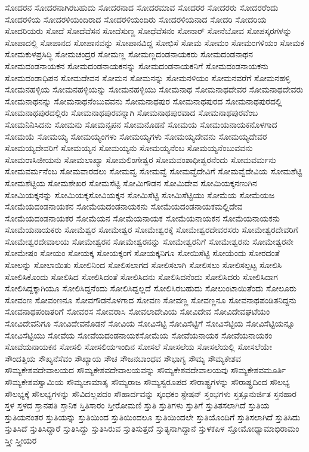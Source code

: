 {ಸೋದರನ
ಸೋದರನಾಗಿರಬಹುದು
ಸೋದರನಾದ
ಸೋದರಮಾವ
ಸೋದರರ
ಸೋದರರು
ಸೋದರರೆಂದು
ಸೋದರಳಿಯ
ಸೋದರಳಿಯಂದಿರಾದ
ಸೋದರಳಿಯಂದಿರು
ಸೋದರಳಿಯನಾದ
ಸೋದರಿ
ಸೋದರಿಯ
ಸೋದರಿಯರು
ಸೋದೆ
ಸೋದೆವೆಸನ
ಸೋದೆಸುಣ್ಣ
ಸೋಧೆವೆಸನಂ
ಸೋನಾರ್
ಸೋನೆಬೋವ
ಸೋಪಸ್ಕರಗಳನ್ನು
ಸೋಪಾದಲ್ಲಿ
ಸೋಪಾನದ
ಸೋಪಾನವನ್ನು
ಸೋಪಾನವಿದ್ದ
ಸೋಭಿಸೆ
ಸೋಮ
ಸೋಮಂ
ಸೋಮಂಗಳಿಯಂ
ಸೋಮಕ
ಸೋಮಕುಳಪ್ರಸಿದ್ಧಿ
ಸೋಮಚಂದ್ರರ
ಸೋಮಣ್ಣ
ಸೋಮಣ್ಣದಂಡನಾಯಕರು
ಸೋಮದಂಡನಾಥನ
ಸೋಮದಂಡನಾಯಕನ
ಸೋಮದಂಡನಾಯಕನನ್ನು
ಸೋಮದಂಡನಾಯಕನಿಗೆ
ಸೋಮದಂಡನಾಯಕನು
ಸೋಮದಂಡಾಧಿಪನ
ಸೋಮದೇವನ
ಸೋಮನ
ಸೋಮನನ್ನು
ಸೋಮನಳಿಯಂ
ಸೋಮನವರೆಗೆ
ಸೋಮನಹಳ್ಳಿ
ಸೋಮನಹಳ್ಳಿಯ
ಸೋಮನಹಳ್ಳಿಯನ್ನು
ಸೋಮನಹಳ್ಳಿಯು
ಸೋಮನಾಥ
ಸೋಮನಾಥದೇವರ
ಸೋಮನಾಥದೇವರು
ಸೋಮನಾಥನನ್ನು
ಸೋಮನಾಥನೆಂಬುವವನು
ಸೋಮನಾಥಪುರ
ಸೋಮನಾಥಪುರದ
ಸೋಮನಾಥಪುರದಲ್ಲಿ
ಸೋಮನಾಥಪುರದಲ್ಲಿರು
ಸೋಮನಾಥಪುರವನ್ನಾಗಿ
ಸೋಮನಾಥಪುರವಾದ
ಸೋಮನಾಥಪುರವೆಂಬ
ಸೋಮನಿನಿಸಿದನು
ಸೋಮನು
ಸೋಮನೃಪನ
ಸೋಮನೊಡನೆ
ಸೋಮಯ
ಸೋಮಯನಾಯಕನೊಳಗಾದ
ಸೋಮಯೆ
ಸೋಮಯ್ಯ
ಸೋಮಯ್ಯಂಗಳು
ಸೋಮಯ್ಯಗಳು
ಸೋಮಯ್ಯದೇವನು
ಸೋಮಯ್ಯದೇವರ
ಸೋಮಯ್ಯದೇವರಿಗೆ
ಸೋಮಯ್ಯನ
ಸೋಮಯ್ಯನು
ಸೋಮಯ್ಯನೆಂಬ
ಸೋಮಯ್ಯನೆಂಬುವವನು
ಸೋಮರಾಸಿಜೀಯನು
ಸೋಮಲಾಖ್ಯಾ
ಸೋಮಲಿಂಗೇಶ್ವರ
ಸೋಮವಂಶಾಧೀಶ್ವರನೆಂದು
ಸೋಮವರ್ಮನು
ಸೋಮವರ್ಮನೆಂಬ
ಸೋಮವಾರದಲು
ಸೋಮವ್ವ
ಸೋಮವ್ವೆ
ಸೋಮವ್ವೆದೇವಿಗೆ
ಸೋಮವ್ವೆದೇವಿಯ
ಸೋಮಶೆಟ್ಟಿ
ಸೋಮಶೆಟ್ಟಿಯ
ಸೋಮಶೇಖರ
ಸೋಮಸೆಟ್ಟಿ
ಸೋಮಿಗೌಡನ
ಸೋಮಿದೇವ
ಸೋಮಿಯಕ್ಕನಣುಗಿನ
ಸೋಮಿಯಕ್ಕನನ್ನು
ಸೋಮಿಯಕ್ಕಸೋವಿಯಕ್ಕನ
ಸೋಮಿಸೆಟ್ಟಿ
ಸೋಮಿಸೆಟ್ಟಿಯು
ಸೋಮೆಯ
ಸೋಮೆಯಜ
ಸೋಮೆಯದಂಡನಾಯಕನ
ಸೋಮೆಯದಂಡನಾಯಕನು
ಸೋಮೆಯದಂಡನಾಯಕಮಲ್ಲಿದೇವ
ಸೋಮೆಯದಂಡನಾಯಕರ
ಸೋಮೆಯನ
ಸೋಮೆಯನಾಯಕ
ಸೋಮೆಯನಾಯಕನ
ಸೋಮೆಯನಾಯಕನು
ಸೋಮೆಯನಾಯಕರು
ಸೋಮೆಶ್ವರ
ಸೋಮೇಶ್ವರ
ಸೋಮೇಶ್ವರಕ್ಕೆ
ಸೋಮೇಶ್ವರದೇವರಸರು
ಸೋಮೇಶ್ವರದೇವರಿಗೆ
ಸೋಮೇಶ್ವರದೇವಾಲಯ
ಸೋಮೇಶ್ವರನ
ಸೋಮೇಶ್ವರನನ್ನು
ಸೋಮೇಶ್ವರನಿಗೆ
ಸೋಮೇಶ್ವರನು
ಸೋಮೇಶ್ವರನೇ
ಸೋಮೇಷಂ
ಸೋಯಂ
ಸೋಯಕ್ಕ
ಸೋಯಕ್ಕಂಗೆ
ಸೋಯಕ್ಕನಿಗೂ
ಸೋಯಿಸೆಟ್ಟಿ
ಸೋಯೆಂದು
ಸೋರದಂತೆ
ಸೋಲನ್ನು
ಸೋಲಾಯಿತು
ಸೋಲಿನಿಂದ
ಸೋಲಿಸಲಾಗದ
ಸೋಲಿಸಲಾಗಿ
ಸೋಲಿಸಲು
ಸೋಲಿಸಲ್ಪಟ್ಟ
ಸೋಲಿಸಿ
ಸೋಲಿಸಿಕೊಂದು
ಸೋಲಿಸಿದ
ಸೋಲಿಸಿದಂತೆ
ಸೋಲಿಸಿದನು
ಸೋಲಿಸಿದನೆಂದು
ಸೋಲಿಸಿದರು
ಸೋಲಿಸಿದಾಗ
ಸೋಲಿಸಿದ್ದಕ್ಕಾಗಿಯೂ
ಸೋಲಿಸಿದ್ದನೆಂದು
ಸೋಲಿಸಿದ್ದಲ್ಲದೆ
ಸೋಲಿಸಿರಬಹುದು
ಸೋಲುಂಟಾಯಿತೆಂದು
ಸೋಲೂರು
ಸೋವಂಣ
ಸೋವಂಣನೂ
ಸೋವಗೌಡನೊಳಗಾದ
ಸೋವಣ
ಸೋವಣ್ಣ
ಸೋವಣ್ಣನೂ
ಸೋವನಾಥಪಂಡಿತನಿದ್ದನು
ಸೋವನಾಥಪಂಡಿತರಿಗೆ
ಸೋವರಸ
ಸೋವರಾಸಿ
ಸೋವಲಾದೇವಿಯ
ಸೋವಿದೇವ
ಸೋವಿದೇವಘಟೆಯಂ
ಸೋವಿದೇವನಿಗೂ
ಸೋವಿದೇವನೊಡನೆ
ಸೋವಿಯ
ಸೋವಿಸೆಟ್ಟಿ
ಸೋವಿಸೆಟ್ಟಿಗೆ
ಸೋವಿಸೆಟ್ಟಿಯ
ಸೋವಿಸೆಟ್ಟಿಯನ್ನೂ
ಸೋವಿಸೆಟ್ಟಿಯು
ಸೋವೆಯ
ಸೋವೆಯದಂಡನಾಯಕಸೋಮೆಯ
ಸೋವೆಯನಾಯಕ
ಸೋವೆಯನಾಯಕಂ
ಸೋವೆಯನಾಯಕನ
ಸೋಸಲಿ
ಸೋಸಲಿಯಇಂದಿನ
ಸೋಸಲೆ
ಸೋಸಲೆಯ
ಸೋಸಲೆಯಲ್ಲಿ
ಸೋಸಲೆಯೇ
ಸೌಂದತ್ತಿಯ
ಸೌಖ್ಯನೆಸೆವಂ
ಸೌಖ್ಯಾಯ
ಸೌಚ
ಸೌಜನಬಾಂಧವ
ಸೌಭಾಗ್ಯ
ಸೌಮ್ಯ
ಸೌಮ್ಯಕೇಶವ
ಸೌಮ್ಯಕೇಶವದೇವಾಲಯದ
ಸೌಮ್ಯಕೇಶವದೇವಾಲಯವನ್ನು
ಸೌಮ್ಯಕೇಶವದೇವಾಲಯವು
ಸೌಮ್ಯಕೇಶವಮೂರ್ತಿ
ಸೌಮ್ಯಕೇಶವಸ್ವಾಮಿಯ
ಸೌಮ್ಯಜಾಮಾತೃ
ಸೌಮ್ಯರಾಜ
ಸೌಮ್ಯಸ್ವರೂಪದ
ಸೌರಾಷ್ಟ್ರಗಳನ್ನು
ಸೌರಾಷ್ಟ್ರದಿಂದ
ಸೌಲಭ್ಯ
ಸೌಲಭ್ಯಕ್ಕೆ
ಸೌಲಭ್ಯಗಳನ್ನು
ಸೌವಿದಲ್ಲಪದಂ
ಸೌಹಾರ್ದವನ್ನು
ಸ್ಕಂಧಕಂ
ಸ್ಟೇಷನ್
ಸ್ತಂಭಗಳು
ಸ್ತತ್ಸೂನುರ್ಜಿತ
ಸ್ತನಹಾರ
ಸ್ತಳ
ಸ್ತಳದ
ಸ್ತಾನಪತಿ
ಸ್ತಾನಿಕ
ಸ್ತಿತಿಸಾರಂ
ಸ್ತೀರೋಮಣಿ
ಸ್ತುತಿ
ಸ್ತುತಿಗಳು
ಸ್ತುತಿಗೆ
ಸ್ತುತಿತಸಲಾಗಿದೆ
ಸ್ತುತಿಯ
ಸ್ತುತಿಯನಂತರ
ಸ್ತುತಿಯನ್ನು
ಸ್ತುತಿಯಿಂದ
ಸ್ತುತಿಯಿಂದಲೂ
ಸ್ತುತಿಯಿಂದಲೇ
ಸ್ತುತಿಯೊಂದಿಗೆ
ಸ್ತುತಿಸಲಾಗಿದೆ
ಸ್ತುತಿಸಿದು
ಸ್ತುತಿಸಿದೆ
ಸ್ತುತಿಸಿದ್ದಾರೆ
ಸ್ತುತಿಸಿದ್ದು
ಸ್ತುತಿಸಿರುವ
ಸ್ತುತಿಸುತ್ತದೆ
ಸ್ತುತ್ಯನಾಗಿದ್ದಾನೆ
ಸ್ತುಳಕಪಿಳ
ಸ್ತೋಮೋಧ್ಯಾಮಾಭಿರಾಮಂ
ಸ್ತ್ರೀ
ಸ್ತ್ರೀಯರ
}
